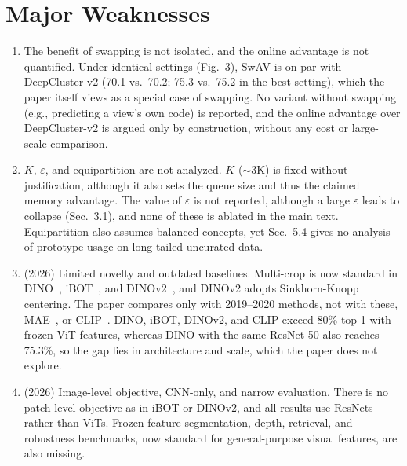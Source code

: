 \documentclass[10pt,twocolumn,letterpaper]{article}
\begin{document}
\section{Major Weaknesses}
\begin{enumerate}
    \item The benefit of swapping is not isolated, and the online advantage is not quantified. Under identical settings (Fig.~3), SwAV is on par with DeepCluster-v2 (70.1 vs.\ 70.2; 75.3 vs.\ 75.2 in the best setting), which the paper itself views as a special case of swapping. No variant without swapping (e.g., predicting a view's own code) is reported, and the online advantage over DeepCluster-v2 is argued only by construction, without any cost or large-scale comparison.

    \item $K$, $\varepsilon$, and equipartition are not analyzed. $K$ ($\sim$3K) is fixed without justification, although it also sets the queue size and thus the claimed memory advantage. The value of $\varepsilon$ is not reported, although a large $\varepsilon$ leads to collapse (Sec.~3.1), and none of these is ablated in the main text. Equipartition also assumes balanced concepts, yet Sec.~5.4 gives no analysis of prototype usage on long-tailed uncurated data.

    \item (2026) Limited novelty and outdated baselines. Multi-crop is now standard in DINO~\cite{caron2021dino}, iBOT~\cite{zhou2022ibot}, and DINOv2~\cite{oquab2024dinov2}, and DINOv2 adopts Sinkhorn-Knopp centering. The paper compares only with 2019--2020 methods, not with these, MAE~\cite{he2022mae}, or CLIP~\cite{radford2021clip}. DINO, iBOT, DINOv2, and CLIP exceed 80\% top-1 with frozen ViT features, whereas DINO with the same ResNet-50 also reaches 75.3\%, so the gap lies in architecture and scale, which the paper does not explore.

    \item (2026) Image-level objective, CNN-only, and narrow evaluation. There is no patch-level objective as in iBOT or DINOv2, and all results use ResNets rather than ViTs. Frozen-feature segmentation, depth, retrieval, and robustness benchmarks, now standard for general-purpose visual features, are also missing.
\end{enumerate}
\end{document}
